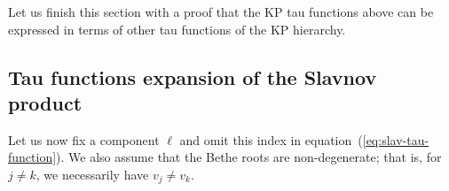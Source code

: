 \documentclass[a4paper,11pt]{amsart}
\begin{document}
Let us finish this section with a proof that the KP tau functions above can be expressed in terms of
other tau functions of the KP hierarchy.

%
%

\subsection{Tau functions expansion of the Slavnov product}

Let us now fix a component \(\ell\) and omit this index in
equation~(\ref{eq:slav-tau-function}). We also assume that the Bethe
roots are non-degenerate; that is, for \(j \neq k\), we necessarily
have \(v_j \neq v_k\).
\end{document}
